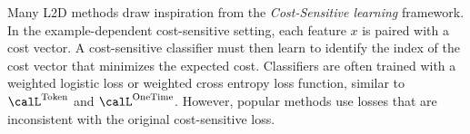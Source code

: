 Many L2D methods draw inspiration from the \textit{Cost-Sensitive learning} framework. In the example-dependent cost-sensitive setting, each feature $x$ is paired with a cost vector. A cost-sensitive classifier must then learn to identify the index of the cost vector that minimizes the expected cost. Classifiers \cite{abe2004iterative,lin2015reduction} are often trained with a weighted logistic loss or weighted cross entropy loss function, similar to $\calL^{\text{Token}}$ and $\calL^{\text{OneTime}}$. However, popular methods \cite{tu2010one,chung2015cost} use losses that are inconsistent with the original cost-sensitive loss.

